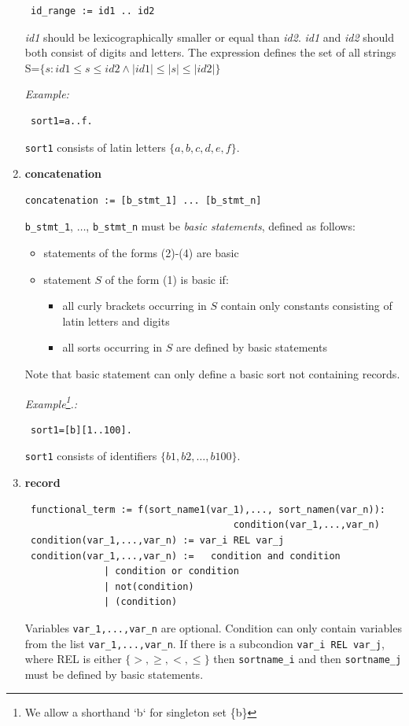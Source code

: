 \documentclass[12pt, letterpaper]{article}
\begin{document}
\begin{enumerate}
\begin{verbatim}
 id_range := id1 .. id2
\end{verbatim}

\textit{id1} should be lexicographically smaller or equal than \textit{id2}. 
\textit{id1} and \textit{id2} should both consist of digits and letters.
The expression defines the set of all strings \\ S=$\{s: id1\leq s \leq id2 \land |id1|\leq |s| \leq |id2|\}$



\textit{Example:}

\begin{verbatim}
 sort1=a..f.
\end{verbatim}
\texttt{sort1} consists of latin letters $\{a,b,c,d,e,f\}$.

\item \textbf{concatenation}
\begin{verbatim}
concatenation := [b_stmt_1] ... [b_stmt_n]
\end{verbatim}

\texttt{b\_stmt\_1}, $\dots$, \texttt{b\_stmt\_n} must be \textit{basic statements}, defined as follows:


\begin{itemize}
 \item statements of the forms (2)-(4) are basic
 \item statement $S$ of the form (1) is basic if:
 \begin{itemize}
  \item all curly brackets occurring in $S$ contain only constants consisting of latin letters and digits
  \item all sorts occurring in $S$ are defined by basic statements 
 \end{itemize}
\end{itemize}
Note that basic statement can only define a basic sort not containing records.

\textit{Example\footnote{We allow a shorthand `b` for singleton  set \{b\}}.:}

\begin{verbatim}
 sort1=[b][1..100].
\end{verbatim}

\texttt{sort1} consists of identifiers $\{b1,b2,\dots, b100\}$.


\item \textbf{record}


\begin{verbatim}
 functional_term := f(sort_name1(var_1),..., sort_namen(var_n)):
                                     condition(var_1,...,var_n)
 condition(var_1,...,var_n) := var_i REL var_j 
 condition(var_1,...,var_n) :=   condition and condition 
              | condition or condition 
              | not(condition) 
              | (condition)
\end{verbatim}
Variables \texttt{var\_1,...,var\_n} are optional.
Condition can only contain variables from the list \texttt{var\_1,...,var\_n}.
If there is a subcondion \texttt{var\_i REL var\_j}, where REL is either $\{>,\geq,<,\leq\}$ then \texttt{sortname\_i} and then \texttt{sortname\_j}
must be defined by basic statements.


\end{enumerate}
\end{document}
